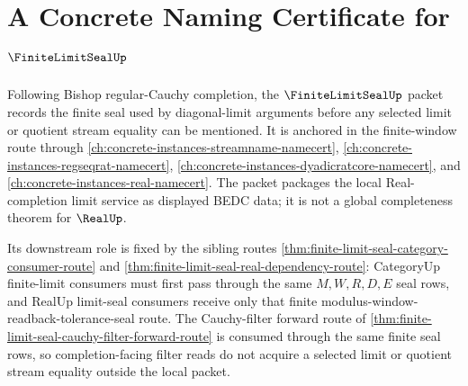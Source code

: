 \chapter{A Concrete Naming Certificate for $\FiniteLimitSealUp$}
\label{ch:concrete-instances-finite-limit-seal-namecert}

Following Bishop regular-Cauchy completion, the $\FiniteLimitSealUp$ packet records the finite seal used by diagonal-limit arguments before any selected limit or quotient stream equality can be mentioned. It is anchored in the finite-window route through \autoref{ch:concrete-instances-streamname-namecert}, \autoref{ch:concrete-instances-regseqrat-namecert}, \autoref{ch:concrete-instances-dyadicratcore-namecert}, and \autoref{ch:concrete-instances-real-namecert}. The packet packages the local Real-completion limit service as displayed BEDC data; it is not a global completeness theorem for $\RealUp$.

Its downstream role is fixed by the sibling routes \autoref{thm:finite-limit-seal-category-consumer-route} and \autoref{thm:finite-limit-seal-real-dependency-route}: CategoryUp finite-limit consumers must first pass through the same $M,W,R,D,E$ seal rows, and RealUp limit-seal consumers receive only that finite modulus-window-readback-tolerance-seal route. The Cauchy-filter forward route of \autoref{thm:finite-limit-seal-cauchy-filter-forward-route} is consumed through the same finite seal rows, so completion-facing filter reads do not acquire a selected limit or quotient stream equality outside the local packet.

